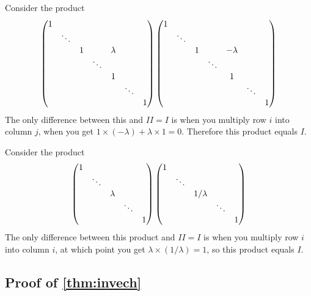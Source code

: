 \documentclass{article}
\begin{document}
\begin{Proof}
Consider the product
\[\begin{pmatrix}
1 & & & & & & \\
& \ddots & & & & & \\
& & 1 & & \lambda & &\\
& & & \ddots & & & \\
& & & & 1 & & \\
& & & & & \ddots &\\
& & & & & & 1
\end{pmatrix}
\begin{pmatrix}
1 & & & & & & \\
& \ddots & & & & & \\
& & 1 & & -\lambda & &\\
& & & \ddots & & & \\
& & & & 1 & & \\
& & & & & \ddots &\\
& & & & & & 1
\end{pmatrix}
\]
The only difference between this and \(II=I\) is when you multiply
row \(i\) into column \(j\), when you get
\(1\times(-\lambda)+\lambda\times 1=0\). Therefore this product
equals \(I\).


Consider the product
\[\begin{pmatrix}
1 & & & & \\
& \ddots & & &\\
& & \lambda & &\\
& & & \ddots & \\
& & & & 1
\end{pmatrix}\begin{pmatrix}
1 & & & & \\
& \ddots & & &\\
& & 1/\lambda & &\\
& & & \ddots & \\
& & & & 1
\end{pmatrix}\]
The only difference between this product and \(II=I\) is when you
multiply row \(i\) into column \(i\), at which point you get
\(\lambda\times(1/\lambda)=1\), so this product equals \(I\).
\qedhere


\end{Proof}
\subsection{Proof of \cref{thm:invech}}
\end{document}
